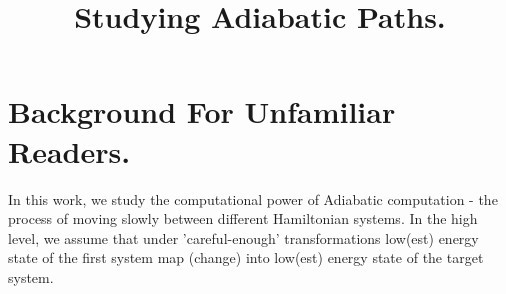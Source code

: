 \documentclass[manuscript,screen,review]{acmart}
\begin{document}

\title{ Studying Adiabatic Paths. }
\maketitle

\newcommand*{\Mbas}{\mathcal{X}^\prime}
\newcommand*{\bas}{\mathcal{X}}
\newcommand*{\sMbas}{\Mbas}
\newcommand*{\QQ}{C_{X}/C_{Z}^\perp }
\newcommand*{\trig}{ Triorthogonal }
\newcommand*{\Hyp}{ Hyperproduct }
\newcommand*{\Cin}{ C_{\text{initial}} }
\newcommand*{\Ctan}{ C_{\text{Tan}} }



\newcommand*{\QACze}{ \mathbf{QAC}_{0} }
\newcommand*{\QNCzef}{ \mathbf{QNC}_{0,f} }
\newcommand*{\QNCon}{ \mathbf{QNC}_{1} }
\newcommand*{\NCon}{ \mathbf{NC}_{1} }
\newcommand*{\noiseQNCon}{ noisy-$\QNCon$ }

\section{Background For Unfamiliar Readers.} In this work, we study the computational power of Adiabatic computation - the process of moving slowly between different Hamiltonian systems. In the high level, we assume that under 'careful-enough' transformations low(est) energy state of the first system map (change) into low(est) energy state of the target system. 
\end{document}
